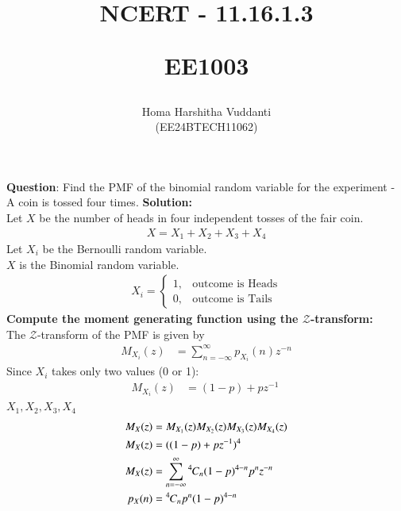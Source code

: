 \documentclass[journal]{IEEEtran}
\begin{document}


\title{
NCERT - 11.16.1.3

\large{EE1003}
}
\author{Homa Harshitha Vuddanti

(EE24BTECH11062)
}	

\maketitle

\bigskip

\renewcommand{\thefigure}{\theenumi}
\renewcommand{\thetable}{\theenumi}
\textbf{Question}: Find the PMF of the binomial random variable for the experiment - A coin is tossed four times.
\textbf{Solution: }\\
Let $X$ be the number of heads in four independent tosses of the fair coin.\\
\begin{align}
    X=X_1+X_2+X_3+X_4
\end{align}
Let $X_i$ be the Bernoulli random variable.\\
$X$ is the Binomial random variable.\\
\begin{align}
X_i=
\begin{cases}
	1, & \text{outcome is Heads}\\
	0, & \text{outcome is Tails}
\end{cases}
\end{align}
\textbf{Compute the moment generating function  using the $\mathcal{Z}$-transform:}\\
The $\mathcal{Z}$-transform of the PMF is given by
\begin{align}
      M_{X_i}(z) &= \sum_{n=-\infty}^{\infty} p_{X_i}(n) z^{-n}
\end{align}
 Since $X_i$ takes only two values (0 or 1):
    \begin{align}
        M_{X_i}(z) &= (1-p)+pz^{-1}\
    \end{align}
     $X_1,X_2,X_3,X_4$
    \begin{align}
        M_X(z) &= M_{X_1}(z)M_{X_2}(z)M_{X_3}(z)M_{X_4}(z)\\
        M_X(z) &= ((1-p)+pz^{-1})^4\\
        M_X(z) &= \sum_{n=-\infty}^{\infty}{{}^{4}\mkern-1muC_{n}}(1-p)^{4-n}p^nz^{-n}\\
	p_{X}(n) &= {{}^{4}\mkern-1muC_{n}}p^{n}(1-p)^{4-n}
\end{align}
\end{document}
